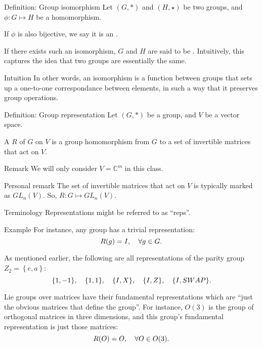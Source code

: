 \documentclass[a4paper]{article}
\begin{document}
\begin{parag}{Definition: Group isomorphism}
    Let $\left(G, *\right)$ and $\left(H, \star\right)$ be two groups, and $\phi: G \mapsto H$ be a homomorphism.

    If $\phi$ is also bijective, we say it is an .

    If there exists such an isomorphism, $G$ and $H$ are said to be . Intuitively, this captures the idea that two groups are essentially the same.

    \begin{subparag}{Intuition}
        In other words, an isomorphism is a function between groups that sets up a one-to-one correspondance between elements, in such a way that it preserves group operations. 
    \end{subparag}
\end{parag}

\begin{parag}{Definition: Group representation}
    Let $\left(G, *\right)$ be a group, and $V$ be a vector space.

    A  $R$ of $G$ on $V$ is a group homomorphism from $G$ to a set of invertible matrices that act on $V$.

    \begin{subparag}{Remark}
        We will only consider $V = \mathbb{C}^m$ in this class.
    \end{subparag}

    \begin{subparag}{Personal remark}
        The set of invertible matrices that act on $V$ is typically marked as $GL_n\left(V\right)$. So, $R: G \mapsto GL_n\left(V\right)$.
    \end{subparag}

    \begin{subparag}{Terminology}
        Representations might be referred to as ``reps''. 
    \end{subparag}

    \begin{subparag}{Example}
        For instance, any group has a trivial representation: 
        \[R\left(g\right) = I, \mathspace \forall g \in G.\]

        As mentioned earlier, the following are all representations of the parity group $Z_2 = \left\{e, a\right\}$: 
        \[\left\{1, -1\right\}, \mathspace \left\{1, 1\right\}, \mathspace \left\{I, X\right\}, \mathspace \left\{I, Z\right\}, \mathspace \left\{I, SWAP\right\}.\]

        Lie groups over matrices have their fundamental representations which are ``just the obvious matrices that define the group''. For instance, $O\left(3\right)$ is the group of orthogonal matrices in three dimensions, and this group's fundamental representation is just those matrices: 
        \[R\left(O\right) = O, \mathspace \forall O \in O\left(3\right).\]
    \end{subparag}
\end{parag}
\end{document}
